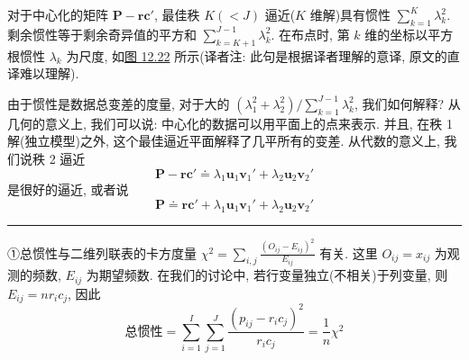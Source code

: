 对于中心化的矩阵 $\mathbf{P}-\mathbf{r}\mathbf{c}'$, 最佳秩 $K(<J)$ 逼近($K$ 维解)具有惯性 $\sum_{k=1}^{K}\lambda_k^2$. 剩余惯性等于剩余奇异值的平方和 $\sum_{k=K+1}^{J-1}\lambda_k^2$. 在布点时, 第 $k$ 维的坐标以平方根惯性 $\lambda_k$ 为尺度, 如\hyperref[fig:12.22]{图 12.22} 所示(译者注: 此句是根据译者理解的意译, 原文的直译难以理解).


由于惯性是数据总变差的度量, 对于大的 $(\lambda_1^2+\lambda_2^2)\big/\sum_{k=1}^{J-1}\lambda_k^2$, 我们如何解释? 从几何的意义上, 我们可以说: 中心化的数据可以用平面上的点来表示. 并且, 在秩 1 解(独立模型)之外, 这个最佳逼近平面解释了几平所有的变差. 从代数的意义上, 我们说秩 2 逼近
\[
\mathbf{P}-\mathbf{r}\mathbf{c}'\doteq\lambda_1\mathbf{u}_1\mathbf{v}_1'+\lambda_2\mathbf{u}_2\mathbf{v}_2'
\]
是很好的逼近, 或者说
\[
\mathbf{P}\doteq\mathbf{r}\mathbf{c}'+\lambda_1\mathbf{u}_1\mathbf{v}_1'+\lambda_2\mathbf{u}_2\mathbf{v}_2'
\]

\vspace{6pt}
\noindent\rule{\linewidth}{0.4pt}
\par\vspace{2pt}
{①\quad 总惯性与二维列联表的卡方度量
$\chi^2=\sum\limits_{i,j}\frac{(O_{ij}-E_{ij})^2}{E_{ij}}$ 有关. 这里 $O_{ij}=x_{ij}$ 为观测的频数,
$E_{ij}$ 为期望频数. 在我们的讨论中, 若行变量独立(不相关)于列变量, 则 $E_{ij}=nr_ic_j$, 因此
\[
\text{总惯性}=\sum_{i=1}^{I}\sum_{j=1}^{J}\frac{(p_{ij}-r_ic_j)^2}{r_ic_j}=\frac{1}{n}\chi^2
\]}
